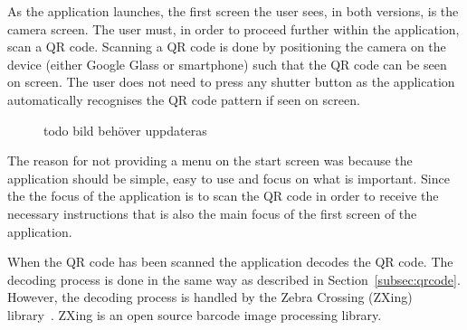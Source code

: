As the application launches, the first screen the user sees, in both versions, is the camera screen. The user must, in order to proceed further within the application, scan a QR code. Scanning a QR code is done by positioning the camera on the device (either Google Glass or smartphone) such that the QR code can be seen on screen. The user does not need to press any shutter button as the application automatically recognises the QR code pattern if seen on screen.%

	
	\begin{figure}[ht!]
		\centering
   		 \qquad
   		 \qquad
		\caption{todo bild behöver uppdateras}
		\label{glassDemoQR}
	\end{figure}

The reason for not providing a menu on the start screen was because the application should be simple, easy to use and focus on what is important. Since the the focus of the application is to scan the QR code in order to receive the necessary instructions that is also the main focus of the first screen of the application.

When the QR code has been scanned the application decodes the QR code. The decoding process is done in the same way as described in Section~\ref{subsec:qrcode}. However, the decoding process is handled by the Zebra Crossing (ZXing) library~\cite{zxing}. ZXing is an open source barcode image processing library.

